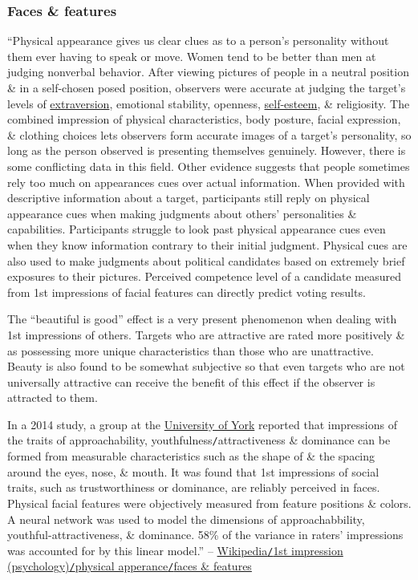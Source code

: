 \documentclass[oneside]{book}
\numberwithin{equation}{section}
\begin{document}
\subsubsection{Faces \& features}
``Physical appearance gives us clear clues as to a person's personality without them ever having to speak or move. Women tend to be better than men at judging nonverbal behavior. After viewing pictures of people in a neutral position \& in a self-chosen posed position, observers were accurate at judging the target's levels of \href{https://en.wikipedia.org/wiki/Extraversion}{extraversion}, emotional stability, openness, \href{https://en.wikipedia.org/wiki/Self-esteem}{self-esteem}, \& religiosity. The combined impression of physical characteristics, body posture, facial expression, \& clothing choices lets observers form accurate images of a target's personality, so long as the person observed is presenting themselves genuinely. However, there is some conflicting data in this field. Other evidence suggests that people sometimes rely too much on appearances cues over actual information. When provided with descriptive information about a target, participants still reply on physical appearance cues when making judgments about others' personalities \& capabilities. Participants struggle to look past physical appearance cues even when they know information contrary to their initial judgment. Physical cues are also used to make judgments about political candidates based on extremely brief exposures to their pictures. Perceived competence level of a candidate measured from 1st impressions of facial features can directly predict voting results.

The ``beautiful is good'' effect is a very present phenomenon when dealing with 1st impressions of others. Targets who are attractive are rated more positively \& as possessing more unique characteristics than those who are unattractive. Beauty is also found to be somewhat subjective so that even targets who are not universally attractive can receive the benefit of this effect if the observer is attracted to them.

In a 2014 study, a group at the \href{https://en.wikipedia.org/wiki/University_of_York}{University of York} reported that impressions of the traits of approachability, youthfulness\texttt{/}attractiveness \& dominance can be formed from measurable characteristics such as the shape of \& the spacing around the eyes, nose, \& mouth. It was found that 1st impressions of social traits, such as trustworthiness or dominance, are reliably perceived in faces. Physical facial features were objectively measured from feature positions \& colors. A neural network was used to model the dimensions of approachabbility, youthful-attractiveness, \& dominance. 58\% of the variance in raters' impressions was accounted for by this linear model.'' -- \href{https://en.wikipedia.org/wiki/First_impression_(psychology)#Faces_and_features}{Wikipedia\texttt{/}1st impression (psychology)\texttt{/}physical apperance\texttt{/}faces \& features}
\end{document}
